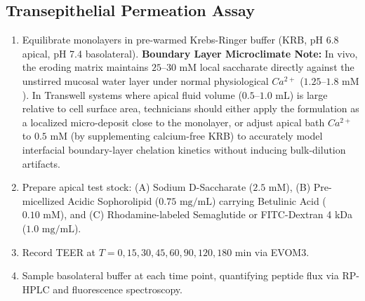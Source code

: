 \documentclass[10pt,twocolumn,letterpaper]{article}
\begin{document}
\subsection{Transepithelial Permeation Assay}
\begin{enumerate}[noitemsep]
    \item Equilibrate monolayers in pre-warmed Krebs-Ringer buffer (KRB, pH 6.8 apical, pH 7.4 basolateral). \textbf{Boundary Layer Microclimate Note:} In vivo, the eroding matrix maintains $25\text{--}30\text{ mM}$ local saccharate directly against the unstirred mucosal water layer under normal physiological $Ca^{2+}$ ($1.25\text{--}1.8\text{ mM}$). In Transwell systems where apical fluid volume ($0.5\text{--}1.0\text{ mL}$) is large relative to cell surface area, technicians should either apply the formulation as a localized micro-deposit close to the monolayer, or adjust apical bath $Ca^{2+}$ to $0.5\text{ mM}$ (by supplementing calcium-free KRB) to accurately model interfacial boundary-layer chelation kinetics without inducing bulk-dilution artifacts.
    \item Prepare apical test stock: (A) Sodium D-Saccharate ($2.5\text{ mM}$), (B) Pre-micellized Acidic Sophorolipid ($0.75\text{ mg/mL}$) carrying Betulinic Acid ($0.10\text{ mM}$), and (C) Rhodamine-labeled Semaglutide or FITC-Dextran 4 kDa ($1.0\text{ mg/mL}$).
    \item Record TEER at $T = 0, 15, 30, 45, 60, 90, 120, 180\text{ min}$ via EVOM3.
    \item Sample basolateral buffer at each time point, quantifying peptide flux via RP-HPLC and fluorescence spectroscopy.
\end{enumerate}
\end{document}
